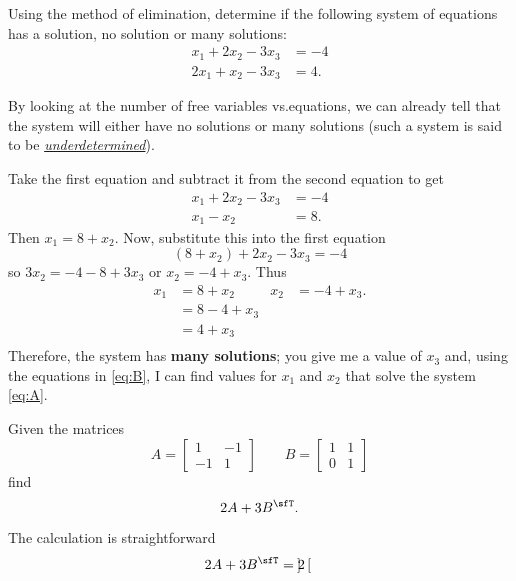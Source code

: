 \begin{questions}
  \question[10] Using the method of elimination, determine if the following
  system of equations has a solution, no solution or many solutions:
  \[
    \label{eq:A}
    \tag{$\bigstar$}
    \begin{aligned}
      x_1+2x_2-3x_3&=-4\\
      2x_1+x_2-3x_3&=4.
    \end{aligned}
  \]
  \begin{solution}
    By looking at the number of free variables vs.\@ equations, we can
    already tell that the system will either have no solutions or many
    solutions (such a system is said to be
    \emph{\href{https://en.wikipedia.org/wiki/Underdetermined_system}{underdetermined}}).

    Take the first equation and subtract it from the second equation to get
    \begin{align*}
      x_1+2x_2-3x_3&=-4\\
      x_1-x_2&=8.
    \end{align*}
    Then $x_1=8+x_2$. Now, substitute this into the first equation
    \[
      (8+x_2)+2x_2-3x_3=-4
    \]
    so $3x_2=-4-8+3x_3$ or $x_2=-4+x_3$. Thus
    \[
      \label{eq:B}
      \tag{$\spadesuit$}
      \begin{aligned}
        x_1&=8+x_2&
        x_2&=-4+x_3.\\
        &=8-4+x_3\\
        &=4+x_3\\
      \end{aligned}
    \]
    Therefore, the system has \textbf{many solutions}; you give me a value
    of $x_3$ and, using the equations in \eqref{eq:B}, I can find values
    for $x_1$ and $x_2$ that solve the system \eqref{eq:A}.
  \end{solution}
  \question[5] Given the matrices
  \[
    A=
    \begin{bmatrix}
      1&-1\\
      -1&1
    \end{bmatrix}
    \qquad
    B=
    \begin{bmatrix}
      1&1\\
      0&1
    \end{bmatrix}
  \]
  find
  \[
    2A+3B^\sfT.
  \]
  \begin{solution}
    The calculation is straightforward
    \begin{align*}
      2A+3B^\sfT
      &=
        2\begin{bmatrix}

\end{bmatrix}
\end{align*}
\end{solution}
\end{questions}
